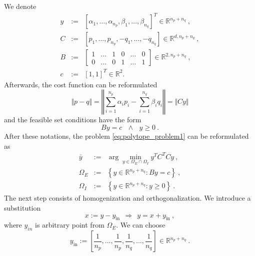 \documentclass{article}
\theoremstyle{definition}
\begin{document}
We denote
\begin{displaymath}
 \begin{array}{rcl}
  y & := & [\alpha_1, \dots, \alpha_{n_p}, \beta_1, \dots, \beta_{n_q}]^T \in \mathbb{R}^{n_p + n_q} ~\mathrm{,} \\
  C & := & [p_1, \dots, p_{n_p}, -q_1, \dots, -q_{n_q}] \in \mathbb{R}^{d, n_p + n_q} ~\mathrm{,} \\
  B & := & 
  \left[
   \begin{array}{cccccc}
    1 & \dots & 1 & 0 & \dots & 0 \\
    0 & \dots & 0 & 1 & \dots & 1 
   \end{array}   
  \right] \in \mathbb{R}^{2, n_p + n_q}  ~\mathrm{,} \\
  c & := & [1,1]^T \in \mathbb{R}^{2} \mathrm{.}
 \end{array}  
\end{displaymath}
Afterwards, the cost function can be reformulated
\begin{displaymath}
 \Vert p - q \Vert  = \left\Vert \sum\limits_{i = 1}^{n_p} \alpha_{i} p_i - \sum\limits_{i = 1}^{n_q} \beta_{i} q_i \right\Vert = \Vert Cy \Vert
\end{displaymath} 
and the feasible set conditions have the form
\begin{displaymath}
 By = c ~~~ \wedge ~~~ y \geq 0 ~\mathrm{.}
\end{displaymath}
After these notations, the problem \eqref{eq:polytope_problem1} can be reformulated as
\begin{equation}
 \label{eq:polytope_problem2}
 \begin{array}{rcl}
  \bar{y} & := & \arg \min\limits_{y \in \Omega_E \cap \Omega_I} y^T C^T C y ~\mathrm{,} \\
  \Omega_E & := & \left\lbrace y \in \mathbb{R}^{n_p + n_q}: By = c \right\rbrace ~\mathrm{,} \\
  \Omega_I & := & \left\lbrace y \in \mathbb{R}^{n_p + n_q}: y \geq 0 \right\rbrace ~\mathrm{.}
 \end{array}
\end{equation}
The next step consists of homogenization and orthogonalization. We introduce a substitution
\begin{equation}
 \label{eq:polytope_subs}
 x := y - y_{\mathrm{in}} ~~ \Rightarrow ~~ y = x + y_{\mathrm{in}} ~\mathrm{,}
\end{equation}
where $y_{in}$ is arbitrary point from $\Omega_E$. We can choose
\begin{displaymath}
 y_{\mathrm{in}} := \left[ \frac{1}{n_p}, \dots, \frac{1}{n_p}, \frac{1}{n_q}, \dots, \frac{1}{n_q} \right] \in \mathbb{R}^{n_p + n_q} ~\mathrm{.} 
\end{displaymath}
\end{document}
